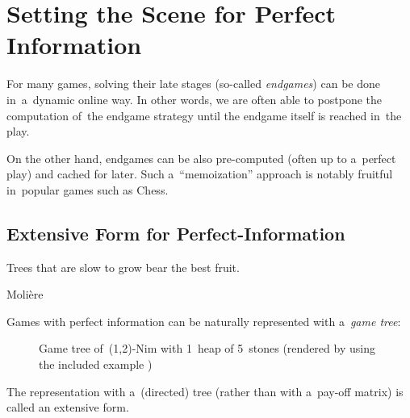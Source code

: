 \chapter{Setting the Scene for Perfect Information}
\label{ch:perf-intro}
For many games, solving their late stages (so-called \emph{endgames}) can be done in~a~dynamic online way.
In other words, we are often able to postpone the computation of~the endgame strategy until the endgame itself is reached in~the play.

On the other hand, endgames can be also pre-computed (often up to a~perfect play) and cached for later.
Such a~``memoization'' approach is notably fruitful in~popular games such as Chess.

\section{Extensive Form for Perfect-Information}
\label{sec:extensive-form-perf-info}
\epigraph{Trees that are slow to grow bear the best fruit.}
{Molière}
Games with perfect information can be naturally represented with a~\emph{game tree}:
\begin{figure}[H]
  \centering
  \scriptsize
  \def\svgwidth{.9\textwidth}
  
  \def\captionTitle{Game tree of~(1,2)-Nim with 1~heap of 5~stones}
  \caption[\captionTitle]{\captionTitle{} (rendered by  using the included example )}
  \label{fig:game-tree-nim-5}
\end{figure}
\noindent
The representation with a~(directed) tree (rather than with a~pay-off matrix) is called an extensive form.

